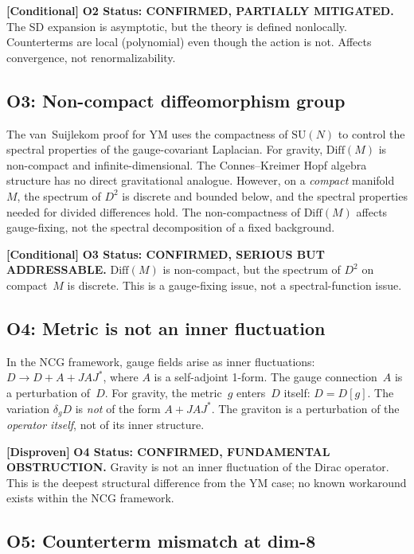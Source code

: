 \documentclass[11pt,a4paper]{article}
\theoremstyle{definition}
\newcommand{\disproof}[1]{%
  \par\smallskip\noindent
  \colorbox{red!10}{\parbox{\dimexpr\linewidth-2\fboxsep}{%
    \textcolor{disproven}{\textbf{[Disproven]}} #1}}%
  \par\smallskip}
\newcommand{\condbox}[1]{%
  \par\smallskip\noindent
  \colorbox{yellow!10}{\parbox{\dimexpr\linewidth-2\fboxsep}{%
    \textcolor{conditional}{\textbf{[Conditional]}} #1}}%
  \par\smallskip}
\begin{document}
\condbox{%
  \textbf{O2 Status: CONFIRMED, PARTIALLY MITIGATED.}
  The SD expansion is asymptotic, but the theory is defined nonlocally.
  Counterterms are local (polynomial) even though the action is not.  Affects
  convergence, not renormalizability.}

\subsection{O3: Non-compact diffeomorphism group}\label{sec:O3}

The van~Suijlekom proof for YM uses the compactness of $\mathrm{SU}(N)$ to
control the spectral properties of the gauge-covariant Laplacian.  For gravity,
$\mathrm{Diff}(M)$ is non-compact and infinite-dimensional.  The
Connes--Kreimer Hopf algebra structure has no direct gravitational analogue.
However, on a \emph{compact} manifold~$M$, the spectrum of $D^2$ is discrete
and bounded below, and the spectral properties needed for divided differences
hold.  The non-compactness of $\mathrm{Diff}(M)$ affects gauge-fixing, not the
spectral decomposition of a fixed background.

\condbox{%
  \textbf{O3 Status: CONFIRMED, SERIOUS BUT ADDRESSABLE.}
  $\mathrm{Diff}(M)$ is non-compact, but the spectrum of $D^2$ on compact~$M$
  is discrete.  This is a gauge-fixing issue, not a spectral-function issue.}

\subsection{O4: Metric is not an inner fluctuation}\label{sec:O4}

In the NCG framework, gauge fields arise as inner fluctuations:
$D \to D + A + JAJ^*$, where $A$ is a self-adjoint 1-form.  The gauge
connection~$A$ is a perturbation of~$D$.  For gravity, the metric~$g$ enters~$D$
itself: $D = D[g]$.  The variation $\delta_g D$ is \emph{not} of the form
$A + JAJ^*$.  The graviton is a perturbation of the \emph{operator itself}, not
of its inner structure.

\disproof{%
  \textbf{O4 Status: CONFIRMED, FUNDAMENTAL OBSTRUCTION.}
  Gravity is not an inner fluctuation of the Dirac operator.  This is the
  deepest structural difference from the YM case; no known workaround exists
  within the NCG framework.}

\subsection{O5: Counterterm mismatch at dim-8}\label{sec:O5}
\end{document}
